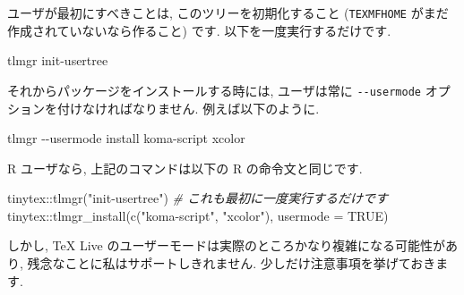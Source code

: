 \documentclass[
  xelatex,ja=standard,jafont=noto]{bxjsreport}
\newenvironment{Shaded}{\begin{snugshade}}{\end{snugshade}}
\newcommand{\AttributeTok}[1]{\textcolor[rgb]{0.77,0.63,0.00}{#1}}
\newcommand{\CommentTok}[1]{\textcolor[rgb]{0.56,0.35,0.01}{\textit{#1}}}
\newcommand{\ConstantTok}[1]{\textcolor[rgb]{0.00,0.00,0.00}{#1}}
\newcommand{\ExtensionTok}[1]{#1}
\newcommand{\FunctionTok}[1]{\textcolor[rgb]{0.00,0.00,0.00}{#1}}
\newcommand{\NormalTok}[1]{#1}
\newcommand{\SpecialCharTok}[1]{\textcolor[rgb]{0.00,0.00,0.00}{#1}}
\newcommand{\StringTok}[1]{\textcolor[rgb]{0.31,0.60,0.02}{#1}}
\begin{document}
ユーザが最初にすべきことは, このツリーを初期化すること
(\texttt{TEXMFHOME} がまだ作成されていないなら作ること) です.
以下を一度実行するだけです.

\begin{Shaded}
\begin{Highlighting}[]
\ExtensionTok{tlmgr}\NormalTok{ init{-}usertree}
\end{Highlighting}
\end{Shaded}

それからパッケージをインストールする時には, ユーザは常に
\texttt{-\/-usermode} オプションを付けなければなりません.
例えば以下のように.

\begin{Shaded}
\begin{Highlighting}[]
\ExtensionTok{tlmgr} \AttributeTok{{-}{-}usermode}\NormalTok{ install koma{-}script xcolor}
\end{Highlighting}
\end{Shaded}

R ユーザなら, 上記のコマンドは以下の R の命令文と同じです.

\begin{Shaded}
\begin{Highlighting}[numbers=left,,]
\NormalTok{tinytex}\SpecialCharTok{::}\FunctionTok{tlmgr}\NormalTok{(}\StringTok{"init{-}usertree"}\NormalTok{) }\CommentTok{\# これも最初に一度実行するだけです}
\NormalTok{tinytex}\SpecialCharTok{::}\FunctionTok{tlmgr\_install}\NormalTok{(}\FunctionTok{c}\NormalTok{(}\StringTok{"koma{-}script"}\NormalTok{, }\StringTok{"xcolor"}\NormalTok{), }\AttributeTok{usermode =} \ConstantTok{TRUE}\NormalTok{)}
\end{Highlighting}
\end{Shaded}

しかし, TeX Live
のユーザーモードは実際のところかなり複雑になる可能性があり,
残念なことに私はサポートしきれません. 少しだけ注意事項を挙げておきます.
\end{document}
